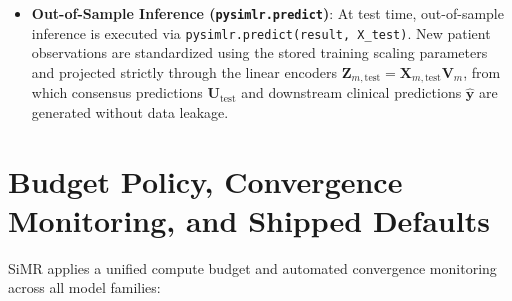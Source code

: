 \documentclass[
  10pt,
  letterpaper,
]{report}
\begin{document}
\begin{itemize}
  \(\boldsymbol{\Sigma} = (\mathbf{I} - \mathbf{B})^{-1}\boldsymbol{\Psi}(\mathbf{I} - \mathbf{B})^{-\top}\)),
  \texttt{observed\_sem.observed\_path\_model} and
  \texttt{compare\_observed\_path\_models} minimize the Gaussian
  maximum-likelihood (ML) discrepancy
  \(F = \log|\boldsymbol{\Sigma}| + \operatorname{tr}(\mathbf{S}\boldsymbol{\Sigma}^{-1}) - \log|\mathbf{S}| - p\)
  and report \(\chi^2 = (n-1)F\), root mean square error of
  approximation (RMSEA) (Steiger 1990), comparative fit index (CFI)
  (Bentler 1990; Hu and Bentler 1999), standardized root mean square
  residual (SRMR), Akaike information criterion (AIC) (Akaike 1974),
  Bayesian information criterion (BIC) (Schwarz 1978), Akaike/Schwarz
  model weights (Burnham and Anderson 2002), mediated \texttt{through=}
  indirect effects with stratified bootstrap intervals, and
  \texttt{covariance\_equivalence}.
\item
  \textbf{Out-of-Sample Inference (\texttt{pysimlr.predict})}: At test
  time, out-of-sample inference is executed via
  \texttt{pysimlr.predict(result,\ X\_test)}. New patient observations
  are standardized using the stored training scaling parameters and
  projected strictly through the linear encoders
  \(\mathbf{Z}_{m,\text{test}} = \mathbf{X}_{m,\text{test}}\mathbf{V}_m\),
  from which consensus predictions \(\mathbf{U}_{\text{test}}\) and
  downstream clinical predictions \(\hat{\mathbf{y}}\) are generated
  without data leakage.
\end{itemize}

\section{Budget Policy, Convergence Monitoring, and Shipped
Defaults}\label{budget-policy-convergence-monitoring-and-shipped-defaults}

SiMR applies a unified compute budget and automated convergence
monitoring across all model families:
\end{document}
